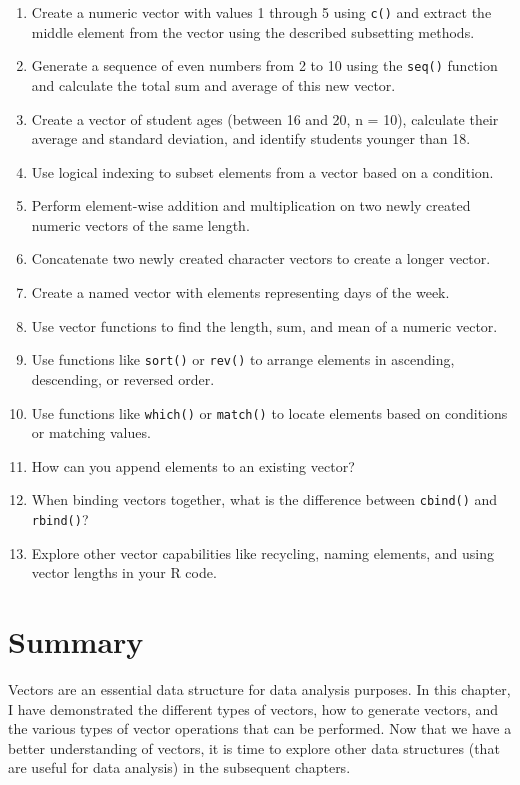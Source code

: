 \documentclass[
  letterpaper,
  DIV=11,
  numbers=noendperiod]{scrreprt}
\providecommand{\tightlist}{%
  \setlength{\itemsep}{0pt}\setlength{\parskip}{0pt}}\usepackage{longtable,booktabs,array}
\begin{document}
\begin{enumerate}
\def\labelenumi{\roman{enumi}.}
\tightlist
\item
  Create a numeric vector with values 1 through 5 using \texttt{c()} and
  extract the middle element from the vector using the described
  subsetting methods.
\item
  Generate a sequence of even numbers from 2 to 10 using the
  \texttt{seq()} function and calculate the total sum and average of
  this new vector.
\item
  Create a vector of student ages (between 16 and 20, n = 10), calculate
  their average and standard deviation, and identify students younger
  than 18.
\item
  Use logical indexing to subset elements from a vector based on a
  condition.
\item
  Perform element-wise addition and multiplication on two newly created
  numeric vectors of the same length.
\item
  Concatenate two newly created character vectors to create a longer
  vector.
\item
  Create a named vector with elements representing days of the week.
\item
  Use vector functions to find the length, sum, and mean of a numeric
  vector.
\item
  Use functions like \texttt{sort()} or \texttt{rev()} to arrange
  elements in ascending, descending, or reversed order.
\item
  Use functions like \texttt{which()} or \texttt{match()} to locate
  elements based on conditions or matching values.
\item
  How can you append elements to an existing vector?
\item
  When binding vectors together, what is the difference between
  \texttt{cbind()} and \texttt{rbind()}?
\item
  Explore other vector capabilities like recycling, naming elements, and
  using vector lengths in your R code.
\end{enumerate}

\section{Summary}\label{summary-8}

Vectors are an essential data structure for data analysis purposes. In
this chapter, I have demonstrated the different types of vectors, how to
generate vectors, and the various types of vector operations that can be
performed. Now that we have a better understanding of vectors, it is
time to explore other data structures (that are useful for data
analysis) in the subsequent chapters.
\end{document}
